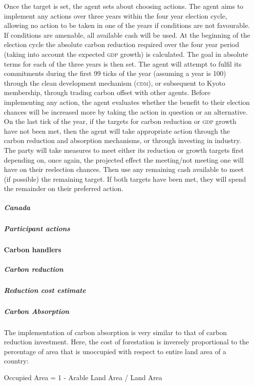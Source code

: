 \documentclass[]{article} %
\begin{document}
Once the target is set, the agent sets about choosing actions. The agent aims to implement any actions over three years within the four year election cycle, allowing no action to be taken in one of the years if conditions are not favourable. If conditions are amenable, all available cash will be used. At the beginning of the election cycle the absolute carbon reduction required over the four year period (taking into account the expected \textsc{gdp} growth) is calculated. The goal in absolute terms for each of the three years is then set. The agent will attempt to fulfil its commitments during the first 99 ticks of the year (assuming a year is 100) through the clean development mechanism (\textsc{cdm}), or subsequent to Kyoto membership, through trading carbon offset with other agents. Before implementing any action, the agent evaluates whether the benefit to their election chances will be increased more by taking the action in question or an alternative. On the last tick of the year, if the targets for carbon reduction or \textsc{gdp} growth have not been met, then the agent will take appropriate action through the carbon reduction and absorption mechanisms, or through investing in industry. The party will take measures to meet either its reduction or growth targets first depending on, once again, the projected effect the meeting/not meeting one will have on their reelection chances. Then use any remaining cash available to meet (if possible) the remaining target. If both targets have been met, they will spend the remainder on their preferred action.

\subparagraph{Canada}

\subparagraph{Participant actions}

\paragraph{Carbon handlers}

\subparagraph{Carbon reduction}

\subparagraph{Reduction cost estimate}

\subparagraph{Carbon Absorption}

The implementation of carbon absorption is very similar to that of carbon reduction investment. Here, the cost of forestation is inversely proportional to the percentage of area that is unoccupied with respect to entire land area of a country:

\begin{center}
Occupied Area = 1 - Arable Land Area / Land Area
\end{center}
\end{document}
